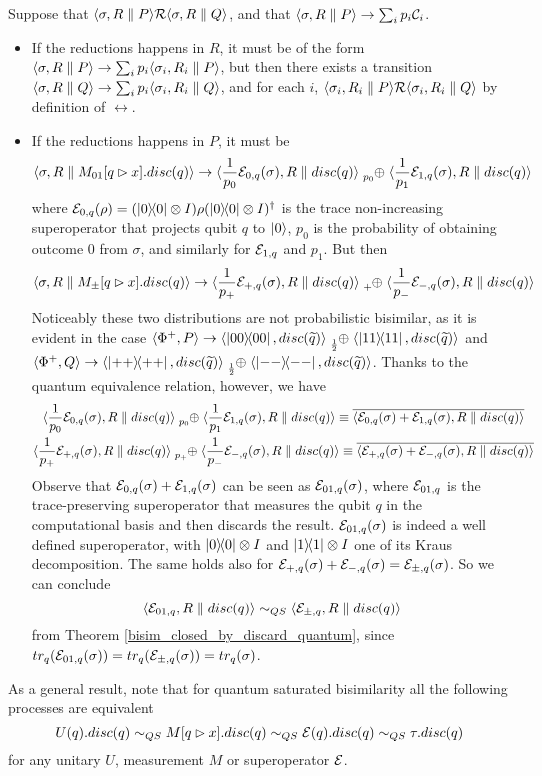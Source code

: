 Suppose that $\langle\sigma, R \parallel P\rangle \mathcal{R} \langle\sigma, R \parallel Q\rangle$, and that $\langle\sigma, R \parallel P\rangle \rightarrow \sum_i p_i \mathcal{C}_i$.\begin{itemize}
\item If the reductions happens in $R$, it must be of the form $\langle\sigma, R \parallel P\rangle \rightarrow \sum_i p_i \langle\sigma_i, R_i \parallel P\rangle$, but then there exists a transition $\langle\sigma, R \parallel Q\rangle \rightarrow \sum_i p_i \langle\sigma_i, R_i \parallel Q\rangle$, and for each $i$, $\langle\sigma_i, R_i \parallel P\rangle \mathcal{R} \langle\sigma_i, R_i \parallel Q\rangle$ by definition of $\rel$.
\item If the reductions happens in $P$, it must be 
 \[\confw{\sigma, R \parallel M_{01}[q \rhd x].disc(q)} \rightarrow \confw{\frac{1}{p_0}\sop_{0, q}(\sigma), R \parallel disc(q)} \psum{p_0} \confw{\frac{1}{p_1}\sop_{1, q}(\sigma), R \parallel disc(q)}\]
 where $\mathcal{E}_{0, q}(\rho) = (\ket{0}\!\!\bra{0}\otimes I) \rho (\ket{0}\!\!\bra{0} \otimes I)^\dagger$ is the trace non-increasing superoperator that projects qubit $q$ to $\ket{0}$, $p_0$ is the probability of obtaining outcome $0$ from $\sigma$, and similarly for $\mathcal{E}_{1, q }$ and $p_1$. But then  
 \[\confw{\sigma, R \parallel M_\pm[q \rhd x].disc(q)} \rightarrow \confw{\frac{1}{p_+}\sop_{+, q}(\sigma), R \parallel disc(q)} \psum{+} \confw{\frac{1}{p_-}\sop_{-, q}(\sigma), R \parallel disc(q)}
 \] 
 Noticeably these two distributions are not probabilistic bisimilar, as it is evident in the case $\confw{\Phi^+, P} \rightarrow \confw{\proj{00}, \discQ} \psum{\frac{1}{2}} \confw{\proj{11}, \discQ}$ and $\confw{\Phi^+, Q} \rightarrow \confw{\proj{++}, \discQ} \psum{\frac{1}{2}} \confw{\proj{--}, \discQ}$.  Thanks to the quantum equivalence relation, however, we have 
 \begin{gather*}
 \confw{\frac{1}{p_0}\sop_{0, q}(\sigma), R \parallel disc(q)} \psum{p_0} \confw{\frac{1}{p_1}\sop_{1, q}(\sigma), R \parallel disc(q)} \equiv \overline{\confw{\sop_{0, q}(\sigma) + \sop_{1, q}(\sigma), R \parallel disc(q)}}
 \\
 \confw{\frac{1}{p_+}\sop_{+, q}(\sigma), R \parallel disc(q)} \psum{p_+} \confw{\frac{1}{p_-}\sop_{-, q}(\sigma), R \parallel disc(q)} \equiv \overline{\confw{\sop_{+, q}(\sigma) + \sop_{-, q}(\sigma), R \parallel disc(q)}}
 \end{gather*}
 Observe that $\mathcal{E}_{0, q}(\sigma) + \mathcal{E}_{1, q}(\sigma)$ can be seen as $\mathcal{E}_{01, q}(\sigma)$, where $\mathcal{E}_{01, q}$ is the trace-preserving superoperator that measures the qubit $q$ in the computational basis and then discards the result. $\mathcal{E}_{01, q}(\sigma)$ is indeed a well defined superoperator, with $\ket{0}\!\!\bra{0}\otimes I$ and $\ket{1}\!\!\bra{1}\otimes I$ one of its Kraus decomposition. The same holds also for $\mathcal{E}_{+, q}(\sigma) + \mathcal{E}_{-, q}(\sigma) = \mathcal{E}_{\pm, q}(\sigma)$. So we can conclude
 \[ \langle\mathcal{E}_{01,q},  R \parallel disc(q)\rangle \sim_{QS} \langle\mathcal{E}_{\pm,q},  R \parallel disc(q)\rangle
 \]
 from Theorem \ref{bisim_closed_by_discard_quantum}, since $tr_q(\mathcal{E}_{01, q}(\sigma)) = tr_q(\mathcal{E}_{\pm, q}(\sigma)) = tr_q(\sigma)$.
\end{itemize}

As a general result, note that for quantum saturated bisimilarity all the following processes are equivalent 
\[	U(q).disc(q) \sim_{QS} M[q \rhd x].disc(q) \sim_{QS} \mathcal{E}(q).disc(q) \sim_{QS} \tau.disc(q) \]
for any unitary $U$, measurement $M$ or superoperator $\mathcal{E}$.


